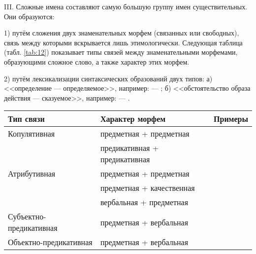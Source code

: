 III. Сложные имена составляют самую большую группу имен существительных. Они образуются:

1) путём сложения двух знаменательных морфем (связанных или свободных), связь между которыми вскрывается лишь этимологически. Следующая таблица (табл. \ref{tab:12}) показывает типы связей между знаменательными морфемами, образующими сложное слово, а также характер этих морфем.

2) путём лексикализации синтаксических образований двух типов:
а) <<определение --- определяемое>>, например:
  --- 
;
б) <<обстоятельство образа действия --- сказуемое>>, например:
 --- .

\begin{tabularx}{\textwidth}{p{}p{}p{}} %
    \caption{Тип связи и характер морфем сложных имен существительных}\label{tab:12}\\
    \toprule
    \parbox{0.2\textwidth}{\centering Тип связи} & \parbox{0.35\textwidth}{\centering Характер морфем} & \parbox{0.35\textwidth}{\centering Примеры}\\
    \midrule
    \endhead
    Ко\-пу\-ля\-тив\-ная & предметная + предметная & \\
    & предикативная + предикативная & \\
    \midrule
    Атри\-бу\-тив\-ная & предметная + предметная & \\
    & предметная + качественная &  \\
    & вербальная + предметная & \\
    \midrule
    Субъектно-пре\-ди\-ка\-тив\-ная & предметная + вербальная & \\
    \midrule
    Объектно-пре\-ди\-ка\-тив\-ная & предметная + вербальная & \\
    \bottomrule
\end{tabularx}

